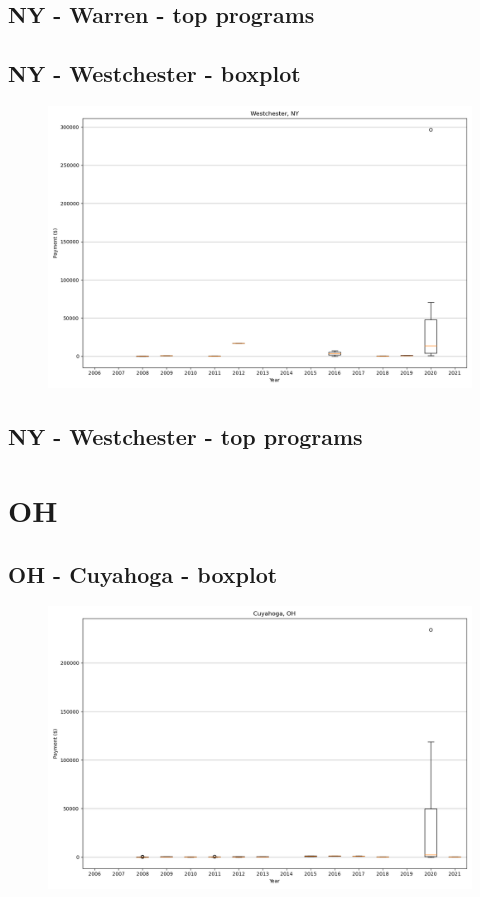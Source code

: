 \subsection*{NY - Warren - top programs}

\newpage
\subsection*{NY - Westchester - boxplot}
\begin{figure}[h]
\centering
\includegraphics[width=7in]{../output/boxplots/counties/Westchester-NY_boxplot.png}
\end{figure}


\subsection*{NY - Westchester - top programs}

\newpage
\section*{OH}
\subsection*{OH - Cuyahoga - boxplot}
\begin{figure}[h]
\centering
\includegraphics[width=7in]{../output/boxplots/counties/Cuyahoga-OH_boxplot.png}
\end{figure}


